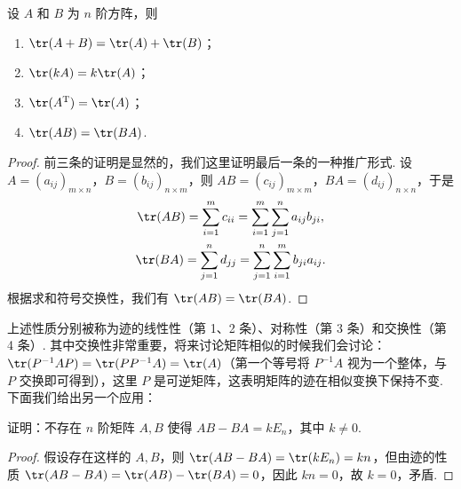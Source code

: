 \begin{theorem}{}{}
    设 $A$ 和 $B$ 为 $n$ 阶方阵，则
    \begin{enumerate}
        \item $\tr(A + B) = \tr(A) + \tr(B)$；
        \item $\tr(kA) = k\tr(A)$；
        \item $\tr(A^{\mathrm{T}}) = \tr(A)$；
        \item $\tr(AB) = \tr(BA)$.
    \end{enumerate}
\end{theorem}

\begin{proof}
    前三条的证明是显然的，我们这里证明最后一条的一种推广形式. 设 $A = (a_{ij})_{m \times n}$，$B = (b_{ij})_{n \times m}$，则 $AB = (c_{ij})_{m \times m}$，$BA = (d_{ij})_{n \times n}$，于是
    \begin{gather*}
        \tr(AB) = \sum\limits_{i=1}^m c_{ii} = \sum\limits_{i=1}^m \sum\limits_{j=1}^n a_{ij}b_{ji}, \\
        \tr(BA) = \sum\limits_{j=1}^n d_{jj} = \sum\limits_{j=1}^n \sum\limits_{i=1}^m b_{ji}a_{ij}.
    \end{gather*}
    根据求和符号交换性，我们有 $\tr(AB) = \tr(BA)$.
\end{proof}

上述性质分别被称为迹的线性性（第 1、2 条）、对称性（第 3 条）和交换性（第 4 条）. 其中交换性非常重要，将来讨论矩阵相似的时候我们会讨论：$\tr(P^{-1}AP) = \tr(PP^{-1}A) = \tr(A)$（第一个等号将 $P^{-1}A$ 视为一个整体，与 $P$ 交换即可得到），这里 $P$ 是可逆矩阵，这表明矩阵的迹在相似变换下保持不变. 下面我们给出另一个应用：
\begin{example}{}{}
    证明：不存在 $n$ 阶矩阵 $A,B$ 使得 $AB - BA = kE_n$，其中 $k \neq 0$.
\end{example}
\begin{proof}
    假设存在这样的 $A, B$，则 $\tr(AB - BA) = \tr(kE_n) = kn$，但由迹的性质 $\tr(AB - BA) = \tr(AB) - \tr(BA) = 0$，因此 $kn = 0$，故 $k = 0$，矛盾.
\end{proof}

